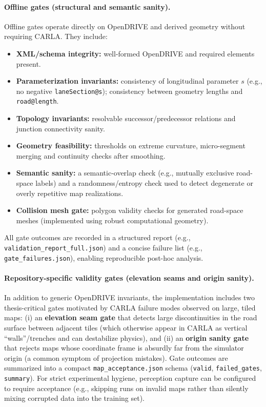 \paragraph{Offline gates (structural and semantic sanity).}
Offline gates operate directly on OpenDRIVE and derived geometry without requiring CARLA.
They include:
\begin{itemize}
    \item \textbf{XML/schema integrity:} well-formed OpenDRIVE and required elements present.
    \item \textbf{Parameterization invariants:} consistency of longitudinal parameter $s$ (e.g., no negative \texttt{laneSection@s}); consistency between geometry lengths and \texttt{road@length}.
    \item \textbf{Topology invariants:} resolvable successor/predecessor relations and junction connectivity sanity.
    \item \textbf{Geometry feasibility:} thresholds on extreme curvature, micro-segment merging and continuity checks after smoothing.
    \item \textbf{Semantic sanity:} a semantic-overlap check (e.g., mutually exclusive road-space labels) and a randomness/entropy check used to detect degenerate or overly repetitive map realizations.
    \item \textbf{Collision mesh gate:} polygon validity checks for generated road-space meshes (implemented using robust computational geometry).
\end{itemize}
All gate outcomes are recorded in a structured report (e.g., \texttt{validation\_report\_full.json}) and a concise failure list (e.g., \texttt{gate\_failures.json}), enabling reproducible post-hoc analysis.

\paragraph{Repository-specific validity gates (elevation seams and origin sanity).}
In addition to generic OpenDRIVE invariants, the implementation includes two thesis-critical gates motivated by CARLA failure modes observed on large, tiled maps:
(i) an \textbf{elevation seam gate} that detects large discontinuities in the road surface between adjacent tiles (which otherwise appear in CARLA as vertical ``walls''/trenches and can destabilize physics), and
(ii) an \textbf{origin sanity gate} that rejects maps whose coordinate frame is absurdly far from the simulator origin (a common symptom of projection mistakes).
Gate outcomes are summarized into a compact \texttt{map\_acceptance.json} schema (\texttt{valid}, \texttt{failed\_gates}, \texttt{summary}).
For strict experimental hygiene, perception capture can be configured to require acceptance (e.g., skipping runs on invalid maps rather than silently mixing corrupted data into the training set).

